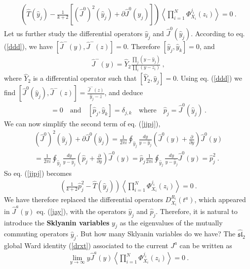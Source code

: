 \documentclass[12pt,a4paper,notitlepage]{report}
\newcommand \la {\left\langle}
\newcommand \ra {\right\rangle}
\newcommand \p {\partial}
\newcommand \pp[1] {{\frac{\p}{\p #1}}}
\numberwithin{equation}{section}
\theoremstyle{break}
\begin{document}
\begin{align}
 \left( \hat{T}(\hat{y}_j) -\frac{1}{k+2}\left[(\hat{J}^0)^2(\hat{y}_j) + \p \hat{J}^0(\hat{y}_j)\right] \right)  \la \prod_{i=1}^N \Phi^{j_i}_{X_i}(z_i)\ra= 0 \ .
\label{jjpj}
\end{align}
Let us further study the differential operators $\hat{y}_j$ and $\hat{J}^0(\hat{y}_j)$. According to eq. (\ref{ddd}), we have $[\hat{J}^-(y),\hat{J}^-(z)]=0$. Therefore $[\hat{y}_j,\hat{y}_k]=0$, and
\begin{align}
 \boxed{\hat{J}^-(y)  = \hat{Y}_2 \frac{\prod_{j}(y-\hat{y}_j)}{\prod_i(y-z_i)}}\ ,
\label{djm}
\end{align}
where $\hat{Y}_2$ is a differential operator such that $[\hat{Y}_2,\hat{y}_j]=0$. Using eq. (\ref{ddd}) we find $[\hat{J}^0(\hat{y}_j),\hat{J}^-(z)] = \frac{\hat{J}^-(z)}{\hat{y}_j-z}$, and deduce
\begin{align}
 [\hat{p}_j,\hat{Y}_2]=0 \quad \text{and} \quad [\hat{p}_j,\hat{y}_k]=\delta_{j,k} \quad \text{where} \quad \hat{p}_j = \hat{J}^0(\hat{y}_j)\ .
\label{pyd}
\end{align}
We can now simplify the second term of eq. (\ref{jjpj}),
\begin{multline}
 (\hat{J}^0)^2(\hat{y}_j) + \p \hat{J}^0(\hat{y}_j) = \frac{1}{2\pi i} \oint_{\hat{y}_j} \frac{dy}{y-\hat{y}_j}\left(\hat{J}^0(y) +\pp{y} \right) \hat{J}^0(y) \\
 = \frac{1}{2\pi i} \oint_{\hat{y}_j} \frac{dy}{y-\hat{y}_j}\left(\hat{p}_j +\pp{y} \right) \hat{J}^0(y)
 = \hat{p}_j \frac{1}{2\pi i} \oint_{\hat{y}_j} \frac{dy}{y-\hat{y}_j} \hat{J}^0(y) = \hat{p}_j^2\ .
\end{multline}
So eq. (\ref{jjpj}) becomes 
\begin{align}
 \boxed{\left(\frac{1}{k+2}\hat{p}_j^2 -\hat{T}(\hat{y}_j)\right) \la \prod_{i=1}^N \Phi^{j_i}_{X_i}(z_i)\ra= 0 }\ .
\label{ppdz}
\end{align}
We have therefore replaced the differential operators $D^{R_i}_{X_i}(t^a)$, which appeared in $\hat{J}^a(y)$ eq. (\ref{jay}), with the operators $\hat{y}_j$ and $\hat{p}_j$. Therefore, it is natural to introduce the
\textbf{\boldmath Sklyanin variables} $y_j$ as the eigenvalues of the mutually commuting operators $\hat{y}_j$. 
But how many Sklyanin variables do we have? 
The $\widehat{\mathfrak{sl}}_2$ global Ward identity (\ref{drxt}) associated to the current $J^a$ can be written as 
\begin{align}
 \underset{y\rightarrow \infty}{\lim} y \hat{J}^a(y) \la \prod_{i=1}^N \Phi^{j_i}_{X_i}(z_i)\ra = 0\ .
\end{align}
\end{document}
